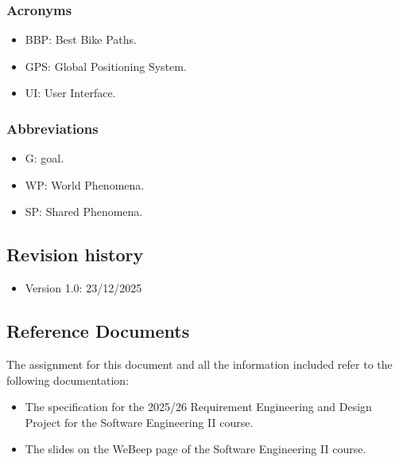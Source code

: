 \subsubsection{Acronyms}
\begin{itemize}
    \item BBP: Best Bike Paths.
    \item GPS: Global Positioning System.
    \item UI: User Interface.
\end{itemize}

\subsubsection{Abbreviations}
\begin{itemize}
    \item G: goal.
    \item WP: World Phenomena.
    \item SP: Shared Phenomena.
\end{itemize}

\subsection{Revision history}
\begin{itemize}
    \item Version 1.0: 23/12/2025
\end{itemize}

\subsection{Reference Documents} %
The assignment for this document and all the information included refer to the following
documentation:
\begin{itemize}
    \item The specification for the 2025/26 Requirement Engineering and Design Project for the Software Engineering II course.
    \item The slides on the WeBeep page of the Software Engineering II course.
\end{itemize}

